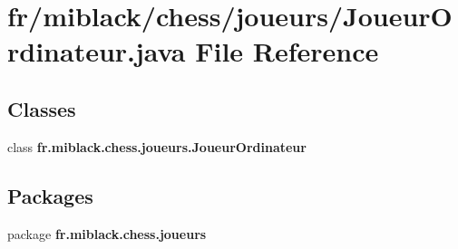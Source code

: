 \section{fr/miblack/chess/joueurs/\-Joueur\-Ordinateur.java File Reference}
\label{JoueurOrdinateur_8java}
\subsection*{Classes}
\begin{DoxyCompactItemize}
\item 
class {\bf fr.\-miblack.\-chess.\-joueurs.\-Joueur\-Ordinateur}
\end{DoxyCompactItemize}
\subsection*{Packages}
\begin{DoxyCompactItemize}
\item 
package {\bf fr.\-miblack.\-chess.\-joueurs}
\end{DoxyCompactItemize}
